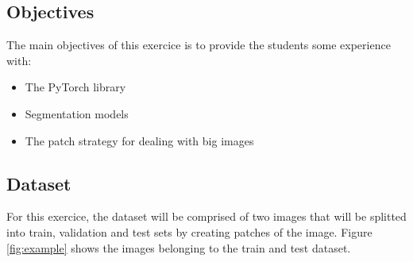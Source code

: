 \documentclass[10pt, a4paper]{article}
\begin{document}
\subsection{Objectives}

The main objectives of this exercice is to provide the students some experience with:

\begin{itemize}
  \item The PyTorch library
  \item Segmentation models
  \item The patch strategy for dealing with big images
\end{itemize}

\subsection{Dataset}

For this exercice, the dataset will be comprised of two images that will be splitted into train, validation and test sets by creating patches of the image. Figure \ref{fig:example}
shows the images belonging to the train and test dataset.
\end{document}
